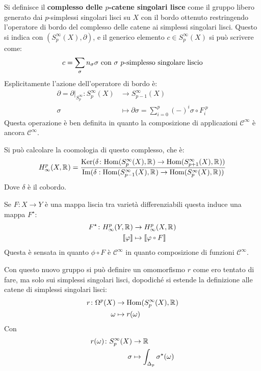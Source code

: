 \begin{definition}
  Si definisce il \textbf{complesso delle $ p $-catene singolari
    lisce} come il gruppo libero
  generato dai $ p $-simplessi singolari lisci su $ X $ con il bordo ottenuto
  restringendo l'operatore di bordo del complesso delle catene ai simplessi
  singolari lisci. Questo si indica con $ (S^\infty_p(X), \partial) $, e il generico
  elemento $ c \in S^\infty_p(X) $ si può scrivere come:
  \[
    c = \sum_\sigma n_\sigma \sigma \text{ con $ \sigma $ $ p $-simplesso singolare liscio}
  \]
  Esplicitamente l'azione dell'operatore di bordo è:
  \begin{align*}
    \partial = \partial \lvert_{S^\infty_p} \colon S_p^\infty(X) & \to S^\infty_{p-1}(X) \\
    \sigma & \mapsto \partial \sigma = \sum_{i=0}^p (-)^i \sigma \circ F_i^{\; p}
  \end{align*}
  Questa operazione è ben definita in quanto la composizione di applicazioni
  $ \mathcal{C}^\infty $ è ancora $ \mathcal{C}^\infty $.
\end{definition}
Si può calcolare la coomologia di questo complesso, che è:
\[
  H^p_\infty(X, \mathbb{R}^{}) = \frac{\mathrm{Ker}(  \delta \colon \mathrm{Hom}( S^\infty_p(X), \mathbb{R}^{}) \to \mathrm{Hom}( S^\infty_{p+1}(X), \mathbb{R}^{}))}{ \mathrm{Im}( \delta : \mathrm{Hom}( S^\infty_{p-1}(X), \mathbb{R}^{}) \to  \mathrm{Hom}( S^\infty_p(X), \mathbb{R}^{}) )}
\]
Dove $ \delta $ è il cobordo.
\begin{osservation}
  Se $ F \colon X \to Y $ è una mappa liscia tra varietà differenziabili
  questa induce una mappa $ F^\star $:
  \begin{align*}
    F^\star \colon H^p_\infty(Y, \RN{}) & \to H^p_\infty(X, \RN{}) \\
    \llbracket \phi \rrbracket & \mapsto \llbracket \phi \circ F \rrbracket
  \end{align*}
  Questa è sensata in quanto $ \phi \circ F $ è $ \mathcal{C}^\infty $ in quanto
  composizione di funzioni $ \mathcal{C}^\infty $.
\end{osservation}
Con questo nuovo gruppo si può definire un omomorfismo $ r $ come ero tentato
di fare, ma solo sui simplessi singolari lisci, dopodiché si estende
la definizione alle catene di simplessi singolari lisci:
\begin{align*}
  r \colon \Omega^p(X) & \to \mathrm{Hom}( S_p^\infty(X), \mathbb{R}^{}) \\
  \omega & \mapsto r(\omega)
\end{align*}
Con
\begin{align*}
  r(\omega) \colon S_p^\infty(X) & \to \mathbb{R}^{} \\
  \sigma & \mapsto \int_{\Delta_p} \sigma^\star(\omega)
\end{align*}
